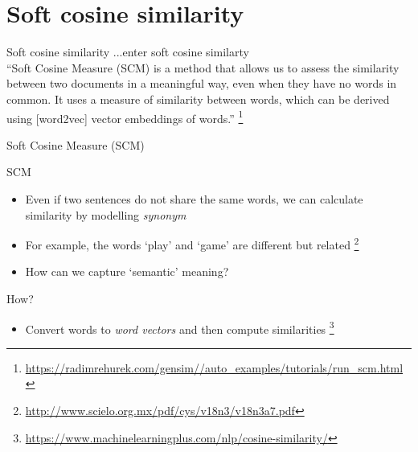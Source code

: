 \documentclass[handout]{beamer}
\begin{document}


\section{Soft cosine similarity}
\begin{frame}{Soft cosine similarity}
	\huge{...enter soft cosine similarty} \parencite{Sidorov2014}\\
	\pause
	\footnotesize{``Soft Cosine Measure (SCM) is a method that allows us to assess the similarity between two documents in a meaningful way, even when they have no words in common. It uses a measure of similarity between words, which can be derived using [word2vec] vector embeddings of words.''}
	\footnote{\url{https://radimrehurek.com/gensim//auto_examples/tutorials/run_scm.html}}
\end{frame}

\begin{frame}{Soft Cosine Measure (SCM)}
	\begin{block}{SCM}
		\begin{itemize}
			\item <1-> Even if two sentences do not share the same words, we can calculate similarity by modelling \emph{synonym}
			\item <2->For example, the words `play' and `game' are different but related \parencite{Sidorov2014} \footnote{\url{http://www.scielo.org.mx/pdf/cys/v18n3/v18n3a7.pdf}}
			\item<3->How can we capture `semantic' meaning?
		\end{itemize}
	\end{block}
	\begin{exampleblock}{How?}
		\begin{itemize}
			\item <4-> Convert words to \emph{word vectors} and then compute similarities  \footnote{\url{https://www.machinelearningplus.com/nlp/cosine-similarity/}}
		\end{itemize}
	\end{exampleblock}
\end{frame}
\end{document}

